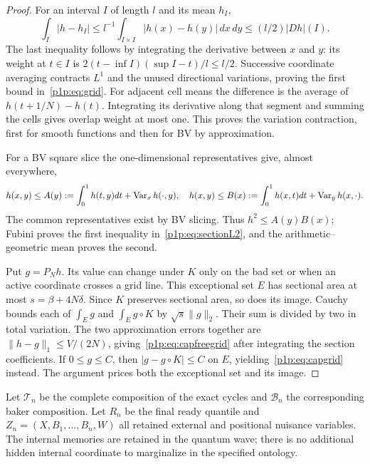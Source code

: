\documentclass[11pt]{article}
\numberwithin{equation}{section}
\theoremstyle{definition}
\theoremstyle{remark}
\begin{document}
\begin{proof}
For an interval $I$ of length $l$ and its mean $h_I$,
\[
 \int_I|h-h_I|\leq l^{-1}\int_{I\times I}|h(x)-h(y)|\,dx\,dy
 \leq (l/2)|Dh|(I).
\]
The last inequality follows by integrating the derivative between $x$
and $y$: its weight at $t\in I$ is
$2(t-\inf I)(\sup I-t)/l\leq l/2$.
Successive coordinate averaging contracts $L^1$ and the unused
directional variations, proving the first bound in~\eqref{p1p:eq:grid}.
For adjacent cell means the difference is the average of
$h(t+1/N)-h(t)$. Integrating its derivative along that segment and summing
the cells gives overlap weight at most one. This proves the variation
contraction, first for smooth functions and then for BV by approximation.

For a BV square slice the one-dimensional representatives give, almost
everywhere,
\[
 h(x,y)\leq A(y):=\int_0^1h(t,y)dt+\operatorname{Var}_x h(\cdot,y),
 \quad
 h(x,y)\leq B(x):=\int_0^1h(x,t)dt+\operatorname{Var}_y h(x,\cdot).
\]
The common representatives exist by BV slicing. Thus $h^2\leq A(y)B(x)$;
Fubini proves the first inequality in~\eqref{p1p:eq:sectionL2}, and the
arithmetic--geometric mean proves the second.

Put $g=P_Nh$. Its value can change under $K$ only on the bad set or when
an active coordinate crosses a grid line. This exceptional set $E$ has
sectional area at most $s=\beta+4N\delta$. Since $K$ preserves sectional
area, so does its image. Cauchy bounds each of
$\int_Eg$ and $\int_Eg\circ K$ by
$\sqrt{s}\|g\|_2$. Their sum is divided by two in total variation.
The two approximation errors together are
$\|h-g\|_1\leq V/(2N)$, giving~\eqref{p1p:eq:capfreegrid} after integrating
the section coefficients. If $0\leq g\leq C$, then
$|g-g\circ K|\leq C$ on $E$, yielding~\eqref{p1p:eq:capgrid} instead.
The argument prices both the exceptional set and its image.
\end{proof}

Let $\mathcal T_n$ be the complete composition of the exact cycles and
$\mathcal B_n$ the corresponding baker composition. Let $R_n$ be the
final ready quantile and $Z_n=(X,B_1,\ldots,B_n,W)$ all retained external
and positional nuisance variables. The internal memories are retained
in the quantum wave; there is no additional hidden internal coordinate
to marginalize in the specified ontology.
\end{document}

